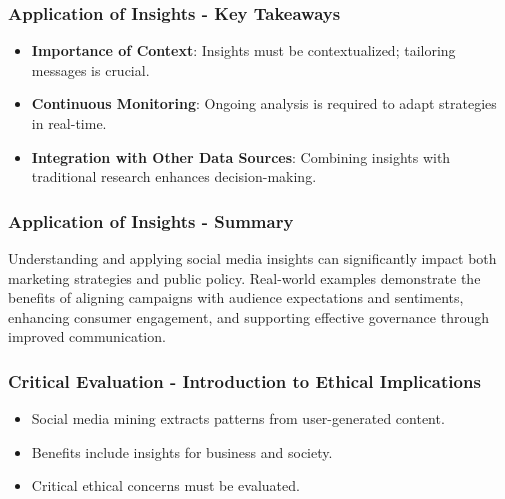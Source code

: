 \documentclass{beamer}
\begin{document}
\begin{frame}[fragile]
    \frametitle{Application of Insights - Key Takeaways}
    \begin{itemize}
        \item \textbf{Importance of Context}: Insights must be contextualized; tailoring messages is crucial.
        \item \textbf{Continuous Monitoring}: Ongoing analysis is required to adapt strategies in real-time.
        \item \textbf{Integration with Other Data Sources}: Combining insights with traditional research enhances decision-making.
    \end{itemize}
\end{frame}

\begin{frame}[fragile]
    \frametitle{Application of Insights - Summary}
    Understanding and applying social media insights can significantly impact both marketing strategies and public policy. 
    Real-world examples demonstrate the benefits of aligning campaigns with audience expectations and sentiments, enhancing consumer engagement, 
    and supporting effective governance through improved communication.
\end{frame}

\begin{frame}[fragile]
    \frametitle{Critical Evaluation - Introduction to Ethical Implications}
    \begin{itemize}
        \item Social media mining extracts patterns from user-generated content.
        \item Benefits include insights for business and society.
        \item Critical ethical concerns must be evaluated.
    \end{itemize}
\end{frame}
\end{document}
